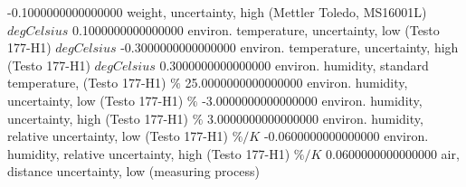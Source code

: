 \expandafter\def\csname oct2tex.param.wghtuc1.v\endcsname{-0.1000000000000000}
\expandafter\def\csname oct2tex.param.wghtuc2.d\endcsname{weight, uncertainty, high (Mettler Toledo, MS16001L)}
\expandafter\def\csname oct2tex.param.wghtuc2.u\endcsname{\ensuremath{deg Celsius}}
\expandafter\def\csname oct2tex.param.wghtuc2.v\endcsname{0.1000000000000000}
\expandafter\def\csname oct2tex.param.tempuc1.d\endcsname{environ. temperature, uncertainty, low (Testo 177-H1)}
\expandafter\def\csname oct2tex.param.tempuc1.u\endcsname{\ensuremath{deg Celsius}}
\expandafter\def\csname oct2tex.param.tempuc1.v\endcsname{-0.3000000000000000}
\expandafter\def\csname oct2tex.param.tempuc2.d\endcsname{environ. temperature, uncertainty, high (Testo 177-H1)}
\expandafter\def\csname oct2tex.param.tempuc2.u\endcsname{\ensuremath{deg Celsius}}
\expandafter\def\csname oct2tex.param.tempuc2.v\endcsname{0.3000000000000000}
\expandafter\def\csname oct2tex.param.humidstdtemp.d\endcsname{environ. humidity, standard temperature, (Testo 177-H1)}
\expandafter\def\csname oct2tex.param.humidstdtemp.u\endcsname{\ensuremath{\%}}
\expandafter\def\csname oct2tex.param.humidstdtemp.v\endcsname{25.0000000000000000}
\expandafter\def\csname oct2tex.param.humiduc1.d\endcsname{environ. humidity, uncertainty, low (Testo 177-H1)}
\expandafter\def\csname oct2tex.param.humiduc1.u\endcsname{\ensuremath{\%}}
\expandafter\def\csname oct2tex.param.humiduc1.v\endcsname{-3.0000000000000000}
\expandafter\def\csname oct2tex.param.humiduc2.d\endcsname{environ. humidity, uncertainty, high (Testo 177-H1)}
\expandafter\def\csname oct2tex.param.humiduc2.u\endcsname{\ensuremath{\%}}
\expandafter\def\csname oct2tex.param.humiduc2.v\endcsname{3.0000000000000000}
\expandafter\def\csname oct2tex.param.humiducrel1.d\endcsname{environ. humidity, relative uncertainty, low (Testo 177-H1)}
\expandafter\def\csname oct2tex.param.humiducrel1.u\endcsname{\ensuremath{\%/K}}
\expandafter\def\csname oct2tex.param.humiducrel1.v\endcsname{-0.0600000000000000}
\expandafter\def\csname oct2tex.param.humiducrel2.d\endcsname{environ. humidity, relative uncertainty, high (Testo 177-H1)}
\expandafter\def\csname oct2tex.param.humiducrel2.u\endcsname{\ensuremath{\%/K}}
\expandafter\def\csname oct2tex.param.humiducrel2.v\endcsname{0.0600000000000000}
\expandafter\def\csname oct2tex.param.distairuc1.d\endcsname{air, distance uncertainty, low (measuring process)}
